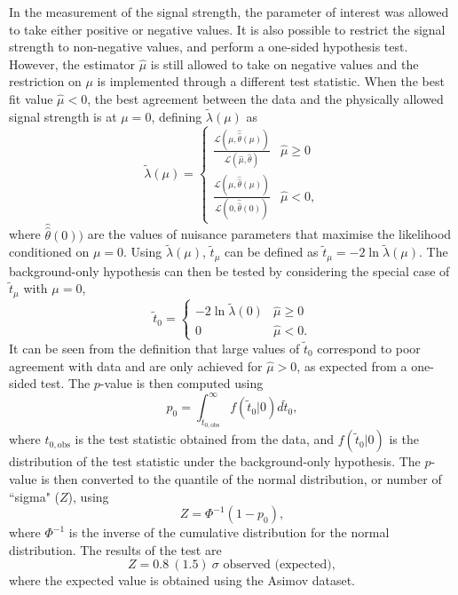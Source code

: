 In the measurement of the signal strength, the parameter of interest
was allowed to take either positive or negative values. It is also
possible to restrict the signal strength to non-negative values, and
perform a one-sided hypothesis test. However, the estimator $\hat\mu$
is still allowed to take on negative values and the restriction on
$\mu$ is implemented through a different test statistic.
When the best fit value $\hat\mu < 0$, the best agreement between 
the data and the physically allowed signal strength is at $\mu = 0$,
defining $\tilde\lambda(\mu)$ as
\begin{equation}
\tilde\lambda(\mu) = 
    \begin{cases}
     \frac{\mathcal{L}(\mu, \hat{\hat\theta}(\mu))}{\mathcal{L}(\hat\mu, \hat\theta)} & \hat\mu \geq 0 \\
     \frac{\mathcal{L}(\mu, \hat{\hat\theta}(\mu))}{\mathcal{L}(0, \hat{\hat\theta}(0))} & \hat\mu < 0,
    \end{cases}
\end{equation}
where $\hat{\hat\theta}(0))$ are the values of nuisance parameters
that maximise the likelihood conditioned on $\mu=0$. Using $\tilde\lambda(\mu)$,
$\tilde{t}_\mu$ can be defined as $\tilde{t}_\mu = -2 \ln{\tilde\lambda(\mu)}$.
The background-only hypothesis can then be tested by considering the
special case of $\tilde{t}_\mu$ with $\mu=0$,
\begin{equation}
\tilde t_0 =
    \begin{cases}
     -2\ln{\tilde\lambda(0)} & \hat\mu \geq 0 \\
     0                       & \hat\mu < 0.
    \end{cases}
\end{equation}
It can be seen from the definition that large values of $\tilde t_0$
correspond to poor agreement with data and are only achieved for
$\hat\mu > 0$, as expected from a one-sided test. The $p$-value is
then computed using
\begin{equation}
p_0 = \int_{\tilde t_{0, \text{obs}}}^{\infty} f(\tilde t_0 | 0) d \tilde t_0,
\end{equation}
where $t_{0, \text{obs}}$ is the test statistic obtained from the data,
and $f(\tilde t_0 | 0)$ is the distribution of the test statistic 
under the background-only hypothesis. The $p$-value is then converted
to the quantile of the normal distribution, or number of ``sigma" ($Z$),
using
\begin{equation}
Z = \Phi^{-1}(1-p_0),
\end{equation}
where $\Phi^{-1}$ is the inverse of the cumulative distribution for
the normal distribution. The results of the test are
\begin{equation}
Z = 0.8~(1.5)~\sigma \text{ observed (expected)},
\end{equation}
where the expected value is obtained using the Asimov dataset.

